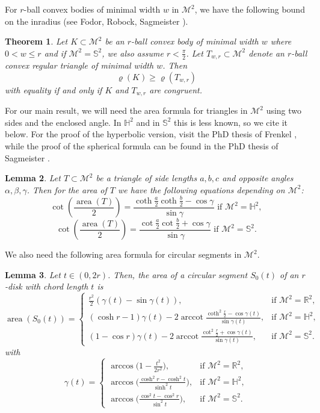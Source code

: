 \documentclass[12pt,reqno]{amsart}
\newtheorem{theorem}{Theorem}[section]
\newtheorem{lemma}[theorem]{Lemma}
\theoremstyle{remark}
\newcommand{\R}{{\mathbb R}}
\newcommand{\hyp}{{\mathbb H}}
\newcommand{\sph}{{\mathbb S}}
\newcommand{\M}{\mathcal{M}}
\DeclareMathOperator{\arccot}{\mathrm{arccot}}
\DeclareMathOperator{\area}{\mathrm{area}}
\begin{document}
For $r$-ball convex bodies of minimal width $w$ in $\M^2$, we have the following bound on the inradius (see Fodor, Robock, Sagmeister \cite{FRS26}).

\begin{theorem}\label{thm:Blaschke}
Let $K\subset\M^2$ be an $r$-ball convex body of minimal width $w$ where $0<w\leq r$ and if $\M^2=\sph^2$, we also assume $r<\frac{\pi}{2}$. Let $T_{w,r}\subset\M^2$ denote an $r$-ball convex regular triangle of minimal width $w$. Then
$$
\varrho\left(K\right)\geq\varrho\left(T_{w,r}\right)
$$
with equality if and only if $K$ and $T_{w,r}$ are congruent.
\end{theorem}

For our main result, we will need the area formula for triangles in $\M^2$ using two sides and the enclosed angle. In $\hyp^2$ and in $\sph^2$ this is less known, so we cite it below. For the proof of the hyperbolic version, visit the PhD thesis of Frenkel \cite{Fre18}, while the proof of the spherical formula can be found in the PhD thesis of Sagmeister \cite{phd}.

\begin{lemma}\label{lemma:triangle-area}
Let $T\subset\M^2$ be a triangle of side lengths $a,b,c$ and opposite angles $\alpha,\beta,\gamma$. Then for the area of $T$ we have the following equations depending on $\M^2$:
$$\cot\left(\frac{\area\left(T\right)}{2}\right)=\frac{\coth\frac{a}{2}\coth\frac{b}{2}-\cos\gamma}{\sin\gamma}\text{ if }\M^2=\hyp^2,$$
$$\cot\left(\frac{\area\left(T\right)}{2}\right)=\frac{\cot\frac{a}{2}\cot\frac{b}{2}+\cos\gamma}{\sin\gamma}\text{ if }\M^2=\sph^2.$$
\end{lemma}

We also need the following area formula for circular segments in $\M^2$.

\begin{lemma}\label{lem:area-of-circular-segment}
Let $t\in(0,2r)$. Then, the area of a circular segment $S_0(t)$ of an $r$-disk with chord length $t$ is
\[
\area(S_0(t))=\begin{cases}
    \frac{r^2}{2}(\gamma(t)-\sin\gamma(t)),&\text{if }\M^2=\R^2,\\
    (\cosh r-1)\gamma(t)-2\arccot\frac{\coth^2\frac{r}{2}-\cos\gamma(t)}{\sin\gamma(t)},&\text{if }\M^2=\hyp^2,\\
    (1-\cos r)\gamma(t)-2\arccot\frac{\cot^2\frac{r}{2}+\cos\gamma(t)}{\sin\gamma(t)},&\text{if }\M^2=\sph^2.
\end{cases}
\]
with
\[
\gamma(t)=\begin{cases}
    \arccos\Big(1-\frac{t^2}{2r^2}\Big),&\text{if }\M^2=\R^2,\\
    \arccos\Big(\frac{\cosh^2 r-\cosh^2 t}{\sinh^2 t}\Big),&\text{if }\M^2=\hyp^2,\\
    \arccos\Big(\frac{\cos^2 t-\cos^2 r}{\sin^2 t}\Big),&\text{if }\M^2=\sph^2.
\end{cases}
\]
\end{lemma}
\end{document}
